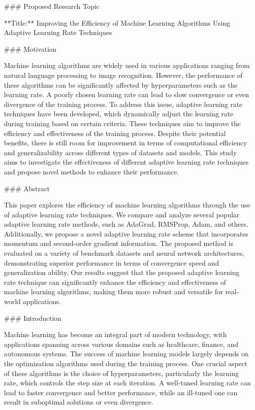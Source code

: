 ### Proposed Research Topic

**Title:** Improving the Efficiency of Machine Learning Algorithms Using Adaptive Learning Rate Techniques

### Motivation

Machine learning algorithms are widely used in various applications ranging from natural language processing to image recognition. However, the performance of these algorithms can be significantly affected by hyperparameters such as the learning rate. A poorly chosen learning rate can lead to slow convergence or even divergence of the training process. To address this issue, adaptive learning rate techniques have been developed, which dynamically adjust the learning rate during training based on certain criteria. These techniques aim to improve the efficiency and effectiveness of the training process. Despite their potential benefits, there is still room for improvement in terms of computational efficiency and generalizability across different types of datasets and models. This study aims to investigate the effectiveness of different adaptive learning rate techniques and propose novel methods to enhance their performance.

### Abstract

This paper explores the efficiency of machine learning algorithms through the use of adaptive learning rate techniques. We compare and analyze several popular adaptive learning rate methods, such as AdaGrad, RMSProp, Adam, and others. Additionally, we propose a novel adaptive learning rate scheme that incorporates momentum and second-order gradient information. The proposed method is evaluated on a variety of benchmark datasets and neural network architectures, demonstrating superior performance in terms of convergence speed and generalization ability. Our results suggest that the proposed adaptive learning rate technique can significantly enhance the efficiency and effectiveness of machine learning algorithms, making them more robust and versatile for real-world applications.

### Introduction

Machine learning has become an integral part of modern technology, with applications spanning across various domains such as healthcare, finance, and autonomous systems. The success of machine learning models largely depends on the optimization algorithms used during the training process. One crucial aspect of these algorithms is the choice of hyperparameters, particularly the learning rate, which controls the step size at each iteration. A well-tuned learning rate can lead to faster convergence and better performance, while an ill-tuned one can result in suboptimal solutions or even divergence.

